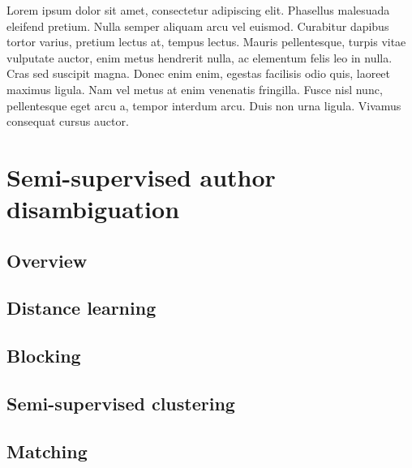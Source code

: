 \documentclass{article}
\begin{document}
Lorem ipsum dolor sit amet, consectetur adipiscing elit. Phasellus malesuada
eleifend pretium. Nulla semper aliquam arcu vel euismod. Curabitur dapibus
tortor varius, pretium lectus at, tempus lectus. Mauris pellentesque, turpis
vitae vulputate auctor, enim metus hendrerit nulla, ac elementum felis leo in
nulla. Cras sed suscipit magna. Donec enim enim, egestas facilisis odio quis,
laoreet maximus ligula. Nam vel metus at enim venenatis fringilla. Fusce nisl
nunc, pellentesque eget arcu a, tempor interdum arcu. Duis non urna ligula.
Vivamus consequat cursus auctor.



\section{Semi-supervised author disambiguation}
\label{methods}

\subsection{Overview}

\subsection{Distance learning}

\subsection{Blocking}

\subsection{Semi-supervised clustering}

\subsection{Matching}


\end{document}
